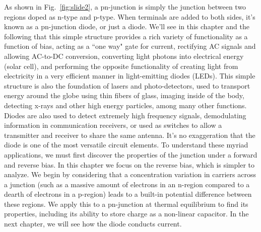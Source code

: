 As shown in Fig.~\ref{fig:slide2}, a pn-junction is simply the junction between two regions doped as n-type and p-type.  When terminals are added to both sides, it's known as a pn-junction diode, or just a diode.  We'll see in this chapter and the following that this simple structure provides a rich variety of functionality as a function of bias, acting as a ``one way" gate for current, rectifying AC signals and allowing AC-to-DC conversion, converting light photons into electrical energy (solar cell), and performing the opposite functionality of creating light from electricity in a very efficient manner in light-emitting diodes (LEDs).  This simple structure is also the foundation of lasers and photo-detectors, used to transport energy around the globe using thin fibers of glass, imaging inside of the body, detecting x-rays and other high energy particles, among many other functions.   Diodes are also used to detect extremely high frequency signals, demodulating information in communication receivers, or used as switches to allow a transmitter and receiver to share the same antenna.  It's no exaggeration that the diode is one of the most versatile circuit elements.  To understand these myriad applications, we must first discover the properties of the junction under a forward and reverse bias.  In this chapter we focus on the reverse bias, which is simpler to analyze.
We begin by considering that a concentration variation in carriers across a junction (such as a massive amount of electrons in an n-region compared to a dearth of electrons in a p-region) leads to a built-in potential difference between these regions.  We apply this to a pn-junction at thermal equilibrium to find its properties, including its ability to store charge as a non-linear capacitor.  In the next chapter, we will see how the diode conducts current.
